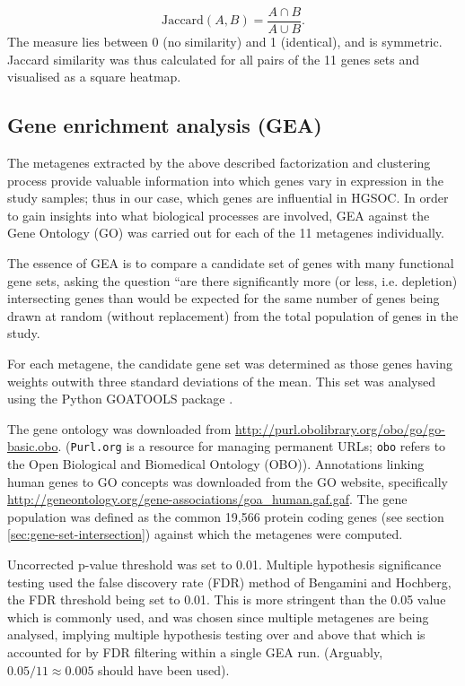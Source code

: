 \documentclass[tikz, 12pt,a4paper,oneside,fleqn]{article}
\begin{document}
\[
   \mbox{Jaccard}(A, B) = \frac{A \cap B}{A \cup B}.
\]
The measure lies between 0 (no similarity) and 1 (identical), and is symmetric.  Jaccard similarity was thus calculated for all pairs of the 11 genes sets and visualised as a square heatmap.
	   	  
\subsection{Gene enrichment analysis (GEA)}
\label{sec-gea}
The metagenes extracted by the above described factorization and clustering process provide valuable information into which genes vary in expression in the study samples; thus in our case, which genes are influential in HGSOC.  
In order to gain insights into what biological processes are involved, GEA against the Gene Ontology (GO) was carried out for each of the 11 metagenes individually.

The essence of GEA is to compare a candidate set of genes with many functional gene sets, asking the question ``are there significantly more (or less, i.e. depletion) intersecting genes than would be expected for the same number of genes being drawn at random (without replacement) from the total population of genes in the study. 

For each metagene, the candidate gene set was determined as those genes having weights outwith three standard deviations of the mean.   This set was analysed using the Python GOATOOLS package \cite{Klopfenstein2018}.   

The gene ontology was downloaded from \url{http://purl.obolibrary.org/obo/go/go-basic.obo}.  ({\tt Purl.org} is a resource for managing permanent URLs; {\tt obo} refers to the Open Biological and Biomedical Ontology (OBO)).  
Annotations linking human genes to GO concepts was downloaded from the GO website, specifically \url{http://geneontology.org/gene-associations/goa_human.gaf.gaf}.   
The gene population was defined as the common 19,566 protein coding genes (see section \ref{sec:gene-set-intersection}) against which the metagenes were computed.  

Uncorrected p-value threshold was set to 0.01.
Multiple hypothesis significance testing used the false discovery rate (FDR) method of Bengamini and Hochberg, the FDR threshold being set to 0.01.  This is more stringent than the 0.05 value which is commonly used, and was chosen since multiple metagenes are being analysed, implying multiple hypothesis testing over and above that which is accounted for by FDR filtering within a single GEA run.  (Arguably, $0.05 / 11 \approx 0.005$ should have been used).
\end{document}
